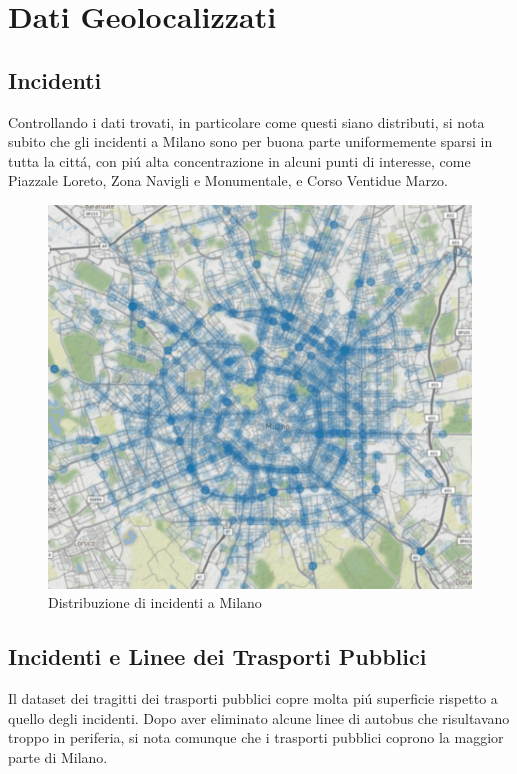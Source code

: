 \documentclass[a4paper]{report}
\begin{document}
\chapter{Dati Geolocalizzati}
\clearpage
\section{Incidenti}

Controllando i dati trovati, in particolare come questi siano distributi, 
si nota subito che gli incidenti a Milano sono per buona parte uniformemente sparsi in tutta la citt\'a, 
con pi\'u alta concentrazione in alcuni punti di interesse, come Piazzale Loreto, Zona Navigli 
e Monumentale, e Corso Ventidue Marzo.

\begin{figure}[!h]
    \includegraphics[width=\linewidth]{../src/incidenti/geo_incidenti.png}
    \caption{Distribuzione di incidenti a Milano}
    \label{fig:geo_incidenti}
\end{figure}



\clearpage
\section{Incidenti e Linee dei Trasporti Pubblici}

Il dataset dei tragitti dei trasporti pubblici copre molta pi\'u superficie rispetto a 
quello degli incidenti.
Dopo aver eliminato alcune linee di autobus che risultavano troppo in periferia, 
si nota comunque che i trasporti pubblici coprono la maggior parte di Milano.
\end{document}
